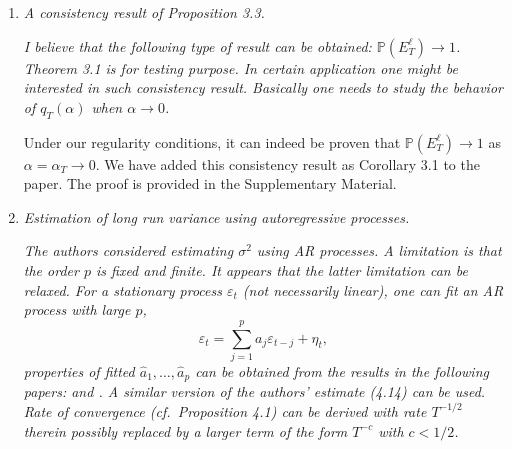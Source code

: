 \documentclass[a4paper,12pt]{article}
\begin{document}
\begin{enumerate}[label=(\arabic*),leftmargin=0.7cm]

\item \textit{A consistency result of Proposition 3.3.}

\textit{I believe that the following type of result can be obtained: $\mathbb{P} (E^{\ell}_T) \to 1$. Theorem 3.1 is for testing purpose. In certain application one might be interested in such consistency result. Basically one needs to study the behavior of $q_T(\alpha)$ when $\alpha \to 0$.}

Under our regularity conditions, it can indeed be proven that $\mathbb{P} (E^{\ell}_T) \to 1$ as $\alpha=\alpha_T \rightarrow 0$. We have added this consistency result as Corollary 3.1 to the paper. The proof is provided in the Supplementary Material.


\item \textit{Estimation of long run variance using autoregressive processes.}

\textit{The authors considered estimating $\sigma^2$ using AR processes. A limitation is that the order $p$ is fixed and finite. It appears that the latter limitation can be relaxed. For a stationary process $\varepsilon_t$ (not necessarily linear), one can fit an AR process with large $p$,}
\[ \varepsilon_t = \sum_{j=1}^p a_j \varepsilon_{t-j} + \eta_t, \]
\textit{properties of fitted $\widehat{a}_1, \ldots, \widehat{a}_p$ can be obtained from the results in the following papers: \cite{WuPourahmadi2009} and \cite{XiaoWu2012}.
A similar version of the authors' estimate (4.14) can be used. Rate of convergence (cf.\ Proposition 4.1) can be derived with rate $T^{-1/2}$ therein possibly replaced by a larger term of the form $T^{-c}$ with $c < 1/2$.}


\end{enumerate}
\end{document}
